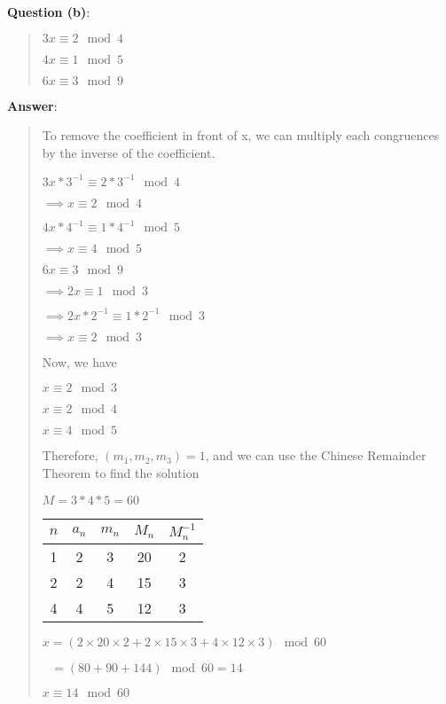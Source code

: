 \documentclass{article} %
\begin{document}
\bigskip
\noindent
\textbf{Question (b)}:
\begin{quote}
    $3x \equiv 2 \mod 4$

    $4x \equiv 1 \mod 5$

    $6x \equiv 3 \mod 9$
\end{quote}
\bigskip
\noindent
\textbf{Answer}:
\begin{quote}
    \noindent To remove the coefficient in front of x, we can multiply each congruences by the inverse of the coefficient.

    $3x * 3^{-1} \equiv 2 * 3^{-1} \mod 4$

    $\implies x \equiv 2 \mod 4$

    \bigskip
    $4x * 4^{-1} \equiv 1 * 4^{-1} \mod 5$

    $\implies x \equiv 4 \mod 5$

    \bigskip
    $6x \equiv 3 \mod 9$

    $\implies 2x \equiv 1 \mod 3$

    $\implies 2x * 2^{-1}  \equiv 1 * 2^{-1} \mod 3$

    $\implies x \equiv 2 \mod 3$

    \bigskip
    Now, we have

    $x \equiv 2 \mod 3$

    $x \equiv 2 \mod 4$

    $x \equiv 4 \mod 5$

    \bigskip
    Therefore, $(m_1, m_2, m_3) = 1$, and we can use the Chinese Remainder Theorem to find the solution

    $M = 3 * 4 * 5 = 60$

    \begin{tabular}{|c|c|c|c|c|}
        \hline
        $n$ & $a_n$ & $m_n$ & $M_n$ & $M_n^{-1}$ \\
        \hline
        1   & 2     & 3     & 20    & 2          \\
        \hline
        2   & 2     & 4     & 15    & 3          \\
        \hline
        4   & 4     & 5     & 12    & 3          \\
        \hline
    \end{tabular}

    $x = (2 \times 20 \times 2 + 2 \times 15 \times 3 + 4 \times 12 \times 3) \mod 60$

    $\text{  } = (80 + 90 + 144) \mod 60 = 14$

    $\boxed{x \equiv 14 \mod 60}$
\end{quote}
\end{document}
